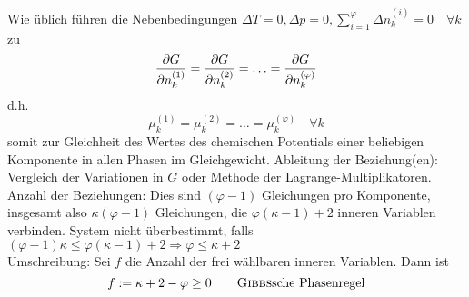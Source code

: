Wie üblich führen die Nebenbedingungen $\Delta T = 0, \Delta p = 0, \sum_{i=1}^{\varphi} \Delta n_k^{(i)} = 0 \quad \forall k$ zu
\begin{equation}
    \frac{\partial G}{\partial n_k^{(1)}} = \frac{\partial G}{\partial n_k^{(2)}} = \ldots = \frac{\partial G}{\partial n_k^{(\varphi)}}
\end{equation}
d.h.
\begin{equation}
    \mu_k^{(1)} = \mu_k^{(2)} = \ldots = \mu_k^{(\varphi)} \quad \forall k
\end{equation}
somit zur Gleichheit des Wertes des chemischen Potentials einer beliebigen Komponente in allen Phasen im Gleichgewicht. Ableitung der Beziehung(en):
Vergleich der Variationen in $G$ oder Methode der Lagrange-Multiplikatoren. \\
Anzahl der Beziehungen: Dies sind $(\varphi - 1)$ Gleichungen pro Komponente, insgesamt also $\kappa (\varphi - 1)$ Gleichungen, die
$\varphi (\kappa - 1) + 2$ inneren Variablen verbinden. System nicht überbestimmt, falls
$(\varphi - 1) \kappa \leq \varphi (\kappa - 1) + 2 \Rightarrow \varphi \leq \kappa + 2$ \\
Umschreibung: Sei $f$ die Anzahl der frei wählbaren inneren Variablen. Dann ist
\begin{equation}
    f := \kappa + 2 - \varphi \geq 0 \qquad \text{\textsc{Gibbs}sche Phasenregel}
\end{equation}
